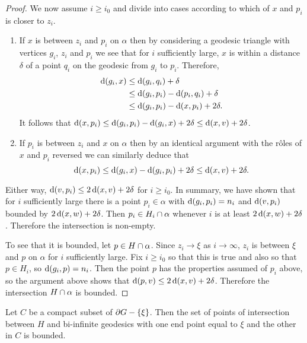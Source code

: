 \documentclass[a4paper]{article}
\begin{document}
\begin{proof}
  We now assume $i \geq i_0$ and divide into cases according to which of $x$
  and $p_i$ is closer to $z_i$.
  \begin{enumerate}
    \item If $x$ is between $z_i$ and $p_i$ on $\alpha$ then by considering a
      geodesic triangle with vertices $g_i$, $z_i$ and $p_i$ we see that for
      $i$ sufficiently large, $x$ is within a distance $\delta$ of a point
      $q_i$ on the geodesic from $g_i$ to $p_i$.  Therefore,
      \begin{align*}
        \operatorname{d}(g_i,x)&\leq \operatorname{d}(g_i,q_i)+\delta\\
                        &\leq \operatorname{d}(g_i,p_i)-\operatorname{d}(p_i,q_i)+\delta\\
                        &\leq \operatorname{d}(g_i,p_i)-\operatorname{d}(x,p_i)+2\delta.
      \end{align*}
      It follows that $\operatorname{d}(x,p_i) \leq \operatorname{d}(g_i,p_i)-\operatorname{d}(g_i,x)+2\delta
      \leq \operatorname{d}(x, v) + 2\delta$.
    \item If $p_i$ is between $z_i$ and $x$ on $\alpha$ then by an identical 
      argument with the r\^oles of $x$ and $p_i$ reversed we can similarly 
      deduce that 
      \begin{equation*}
        \operatorname{d}(x,p_i)\leq\operatorname{d}(g_i,x) - \operatorname{d}(g_i,p_i) + 2\delta \leq  \operatorname{d}(x,v) + 2\delta.
      \end{equation*}
  \end{enumerate}

  Either way, $\operatorname{d}(v, p_i) \leq 2\operatorname{d}(x, v) + 2\delta$ for $i \geq i_0$. In
  summary, we have shown that for $i$ sufficiently large there is a point
  $p_i\in\alpha$ with $\operatorname{d}(g_i,p_i)=n_i$ and $\operatorname{d}(v, p_i)$ bounded by
  $2\operatorname{d}(x,w) + 2\delta$. Then $p_i \in H_i \cap \alpha$ whenever $i$
  is at least $2\operatorname{d}(x,w) + 2\delta$. Therefore the intersection is non-empty. 

  To see that it is bounded, let $p \in H \cap \alpha$. Since $z_i \to
  \xi$ as $i\to \infty$, $z_i$ is between $\xi$ and $p$ on $\alpha$ for $i$
  sufficiently large. Fix $i \geq i_0$ so that this is true and also so that $p
  \in H_i$, so $\operatorname{d}(g_i, p) = n_i$. Then the point $p$ has the properties
  assumed of $p_i$ above, so the argument above shows that $\operatorname{d}(p, v) \leq
  2\operatorname{d}(x,v) + 2\delta$. Therefore the intersection $H \cap \alpha$
  is bounded.
\end{proof}

\begin{lemma}\label{lem:bounded_intersection}
  Let $C$ be a compact subset of $\partial G - \left\{\xi\right\}$. Then the set of points 
  of intersection between $H$ and bi-infinite geodesics with one end point equal 
  to $\xi$ and the other in $C$ is bounded.
\end{lemma}
\end{document}
